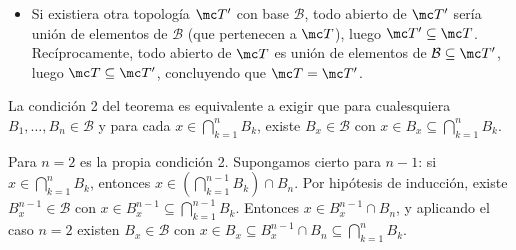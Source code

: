 \begin{dem}
\begin{itemize}
    \item[\textbf{Unicidad:}] Si existiera otra topología \(\mc T'\) con base \(\mathcal{B}\), todo abierto de \(\mc T'\) sería unión de elementos de \(\mathcal{B}\) (que pertenecen a \(\mc T\)), luego \(\mc T' \subseteq \mc T\). Recíprocamente, todo abierto de \(\mc T\) es unión de elementos de \(\mathcal{B} \subseteq \mc T'\), luego \(\mc T \subseteq \mc T'\), concluyendo que \(\mc T = \mc T'\).
\end{itemize}
\end{dem}

\begin{obs}
La condición 2 del teorema es equivalente a exigir que para cualesquiera \(B_1, \ldots, B_n \in \mathcal{B}\) y para cada \(x \in \bigcap_{k=1}^n B_k\), existe \(B_x \in \mathcal{B}\) con \(x \in B_x \subseteq \bigcap_{k=1}^n B_k\).
\end{obs}

\begin{dem}
Para \(n = 2\) es la propia condición 2. Supongamos cierto para \(n-1\): si \(x \in \bigcap_{k=1}^n B_k\), entonces \(x \in (\bigcap_{k=1}^{n-1} B_k) \cap B_n\). Por hipótesis de inducción, existe \(B_x^{n-1} \in \mathcal{B}\) con \(x \in B_x^{n-1} \subseteq \bigcap_{k=1}^{n-1} B_k\). Entonces \(x \in B_x^{n-1} \cap B_n\), y aplicando el caso \(n=2\) existen \(B_x \in \mathcal{B}\) con \(x \in B_x \subseteq B_x^{n-1} \cap B_n \subseteq \bigcap_{k=1}^n B_k\).
\end{dem}

